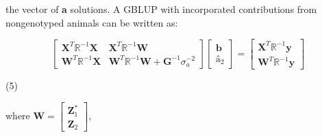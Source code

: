 \documentclass[authordate, empirical]{jote-new-article}
\begin{document}
		\noindent the vector of \textbf{a} solutions. A GBLUP with incorporated contributions from nongenotyped animals can be written as:



	\begin{equation*}
		\begin{bmatrix}
		\textbf{X}^T \mathbb{R}^{-1} \textbf{X}&\textbf{X}^T \mathbb{R}^{-1} \textbf{W}\\\textbf{W}^T \mathbb{R}^{-1} \textbf{X}&\textbf{W}^T \mathbb{R}^{-1} \textbf{W}+\textbf{G}^{-1} \sigma_a^{-2}
		\end{bmatrix}
		\begin{bmatrix}
			\textbf{\^{b}}\\\textbf{\^{a}}_2
		\end{bmatrix}=
		\begin{bmatrix}\textbf{X}^T \mathbb{R}^{-1} \textbf{y}\\\textbf{W}^T \mathbb{R}^{-1} \textbf{y}
		\end{bmatrix}
	\end{equation*}

	\vspace{-1.5\baselineskip}
\begin{center}
		(5)
	\end{center}
where $\textbf{W}=\begin{bmatrix}\textbf{Z}_1^*\\\textbf{Z}_2\end{bmatrix}$, 
\end{document}
